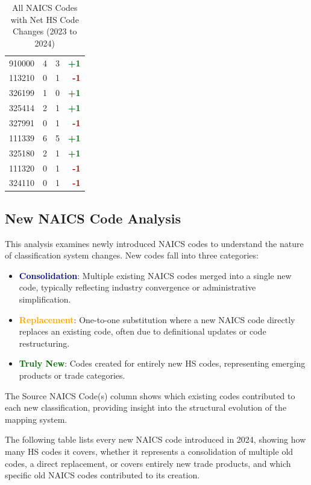 \documentclass[11pt]{article}
\begin{document}
\begin{table}[H]
\begin{minipage}{0.48\textwidth}
\begin{tabular}{lrrr}
910000 & 4 & 3 & \textcolor{darkgreen}{\textbf{+1}} \\
113210 & 0 & 1 & \textcolor{darkred}{\textbf{-1}} \\
326199 & 1 & 0 & \textcolor{darkgreen}{\textbf{+1}} \\
325414 & 2 & 1 & \textcolor{darkgreen}{\textbf{+1}} \\
327991 & 0 & 1 & \textcolor{darkred}{\textbf{-1}} \\
111339 & 6 & 5 & \textcolor{darkgreen}{\textbf{+1}} \\
325180 & 2 & 1 & \textcolor{darkgreen}{\textbf{+1}} \\
111320 & 0 & 1 & \textcolor{darkred}{\textbf{-1}} \\
324110 & 0 & 1 & \textcolor{darkred}{\textbf{-1}} \\
\bottomrule
\end{tabular}
\end{minipage}
\caption{All NAICS Codes with Net HS Code Changes (2023 to 2024)}
\end{table}


\subsection{New NAICS Code Analysis}

This analysis examines newly introduced NAICS codes to understand the nature of classification system changes. New codes fall into three categories:

\begin{itemize}
    \item \textcolor{darkblue}{\textbf{Consolidation}}: Multiple existing NAICS codes merged into a single new code, typically reflecting industry convergence or administrative simplification.
    \item \textcolor{orange}{\textbf{Replacement}}: One-to-one substitution where a new NAICS code directly replaces an existing code, often due to definitional updates or code restructuring.
    \item \textcolor{darkgreen}{\textbf{Truly New}}: Codes created for entirely new HS codes, representing emerging products or trade categories.
\end{itemize}

The Source NAICS Code(s) column shows which existing codes contributed to each new classification, providing insight into the structural evolution of the mapping system.

The following table lists every new NAICS code introduced in 2024, showing how many HS codes it covers, whether it represents a consolidation of multiple old codes, a direct replacement, or covers entirely new trade products, and which specific old NAICS codes contributed to its creation.
\end{document}
